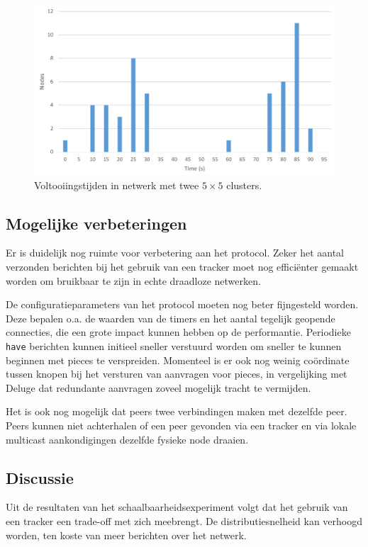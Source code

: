 \documentclass[journal]{IEEEtran}
\begin{document}
\begin{figure}
	\includegraphics[width=\linewidth]{graphs/cluster/two-cluster-seed-12-completion.pdf}
	\caption{Voltooiingstijden in netwerk met twee $5 \times 5$ clusters.}
	\label{fig:eval:hetero:completion}
\end{figure}

\subsection{Mogelijke verbeteringen}
Er is duidelijk nog ruimte voor verbetering aan het protocol. Zeker het aantal verzonden berichten bij het gebruik van een tracker moet nog effici\"enter gemaakt worden om bruikbaar te zijn in echte draadloze netwerken.

De configuratieparameters van het protocol moeten nog beter fijngesteld worden. Deze bepalen o.a. de waarden van de timers en het aantal tegelijk geopende connecties, die een grote impact kunnen hebben op de performantie. Periodieke \texttt{have} berichten kunnen initieel sneller verstuurd worden om sneller te kunnen beginnen met pieces te verspreiden. Momenteel is er ook nog weinig co\"ordinate tussen knopen bij het versturen van aanvragen voor pieces, in vergelijking met Deluge \cite{deluge} dat redundante aanvragen zoveel mogelijk tracht te vermijden.

Het is ook nog mogelijk dat peers twee verbindingen maken met dezelfde peer. Peers kunnen niet achterhalen of een peer gevonden via een tracker en via lokale multicast aankondigingen dezelfde fysieke node draaien.

\subsection{Discussie}
Uit de resultaten van het schaalbaarheidsexperiment volgt dat het gebruik van een tracker een trade-off met zich meebrengt. De distributiesnelheid kan verhoogd worden, ten koste van meer berichten over het netwerk.
\end{document}
